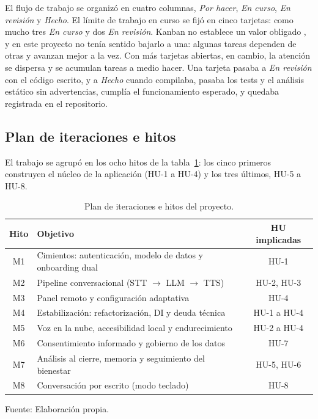 El flujo de trabajo se organizó en cuatro columnas, \textit{Por hacer}, \textit{En curso}, \textit{En revisión} y \textit{Hecho}. El límite de trabajo en curso se fijó en cinco tarjetas: como mucho tres \textit{En curso} y dos \textit{En revisión}. Kanban no establece un valor obligado \citep{Anderson2010}, y en este proyecto no tenía sentido bajarlo a una: algunas tareas dependen de otras y avanzan mejor a la vez. Con más tarjetas abiertas, en cambio, la atención se dispersa y se acumulan tareas a medio hacer. Una tarjeta pasaba a \textit{En revisión} con el código escrito, y a \textit{Hecho} cuando compilaba, pasaba los tests y el análisis estático sin advertencias, cumplía el funcionamiento esperado, y quedaba registrada en el repositorio.

\subsection{Plan de iteraciones e hitos}

El trabajo se agrupó en los ocho hitos de la tabla~\ref{tab:plan-hitos}: los cinco primeros construyen el núcleo de la aplicación (HU-1 a HU-4) y los tres últimos, HU-5 a HU-8.

\begin{table}[htbp]
    \centering
    \caption{Plan de iteraciones e hitos del proyecto.}
    \label{tab:plan-hitos}
    \begin{tabularx}{\textwidth}{@{}c >{\RaggedRight\arraybackslash}X c@{}}
        \toprule
        \textbf{Hito} & \textbf{Objetivo} & \textbf{HU implicadas} \\
        \midrule
        M1 & Cimientos: autenticación, modelo de datos y onboarding dual & HU-1        \\
        M2 & Pipeline conversacional (STT $\rightarrow$ LLM $\rightarrow$ TTS) & HU-2, HU-3 \\
        M3 & Panel remoto y configuración adaptativa              & HU-4        \\
        M4 & Estabilización: refactorización, DI y deuda técnica   & HU-1 a HU-4 \\
        M5 & Voz en la nube, accesibilidad local y endurecimiento  & HU-2 a HU-4 \\
        M6 & Consentimiento informado y gobierno de los datos     & HU-7        \\
        M7 & Análisis al cierre, memoria y seguimiento del bienestar & HU-5, HU-6 \\
        M8 & Conversación por escrito (modo teclado)              & HU-8        \\
        \bottomrule
    \end{tabularx}

    \vspace{2pt}
    {\footnotesize Fuente: Elaboración propia.}
\end{table}

